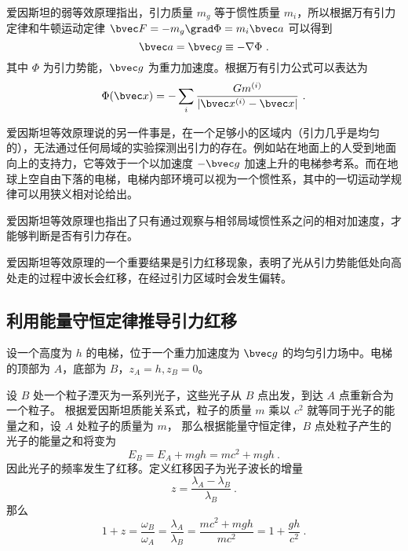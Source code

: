 

爱因斯坦的弱等效原理指出，引力质量 $m_g$ 等于惯性质量 $m_i$，所以根据万有引力定律和牛顿运动定律 $\bvec F=-m_g \grad \Phi = m_i \bvec a$ 可以得到 
\begin{equation}
\bvec a=\bvec g \equiv -\nabla\Phi~.
\end{equation}
其中 $\Phi$ 为引力势能，$\bvec g$ 为重力加速度。根据万有引力公式可以表达为
\begin{equation}
\Phi(\bvec x)=-\sum_{i} \frac{G m^{(i)}}{|\bvec x^{(i)}-\bvec x|}~.
\end{equation}

爱因斯坦等效原理说的另一件事是，在一个足够小的区域内（引力几乎是均匀的），无法通过任何局域的实验探测出引力的存在。例如站在地面上的人受到地面向上的支持力，它等效于一个以加速度 $-\bvec g$ 加速上升的电梯参考系。而在地球上空自由下落的电梯，电梯内部环境可以视为一个惯性系，其中的一切运动学规律可以用狭义相对论给出。

爱因斯坦等效原理也指出了只有通过观察与相邻局域惯性系之问的相对加速度，才能够判断是否有引力存在。

爱因斯坦等效原理的一个重要结果是引力红移现象，表明了光从引力势能低处向高处走的过程中波长会红移，在经过引力区域时会发生偏转。
\subsection{利用能量守恒定律推导引力红移}
设一个高度为 $h$ 的电梯，位于一个重力加速度为 $\bvec g$ 的均匀引力场中。电梯的顶部为 $A$，底部为 $B$，$z_A=h,z_B=0$。

设 $B$ 处一个粒子湮灭为一系列光子，这些光子从 $B$ 点出发，到达 $A$ 点重新合为一个粒子。
根据爱因斯坦质能关系式，粒子的质量 $m$ 乘以 $c^2$ 就等同于光子的能量之和，设 $A$ 处粒子的质量为 $m$，
那么根据能量守恒定律，$B$ 点处粒子产生的光子的能量之和将变为
\begin{equation}
E_B=E_A+mgh = mc^2+mgh~.
\end{equation}
因此光子的频率发生了红移。定义红移因子为光子波长的增量
\begin{equation}
z = \frac{\lambda_A-\lambda_B}{\lambda_B}~.
\end{equation}
那么
\begin{equation}
1+z=\frac{\omega_B}{\omega_A} = \frac{\lambda_A}{\lambda_B} = \frac{mc^2+mgh}{mc^2} = 1+\frac{gh}{c^2}~.
\end{equation}

